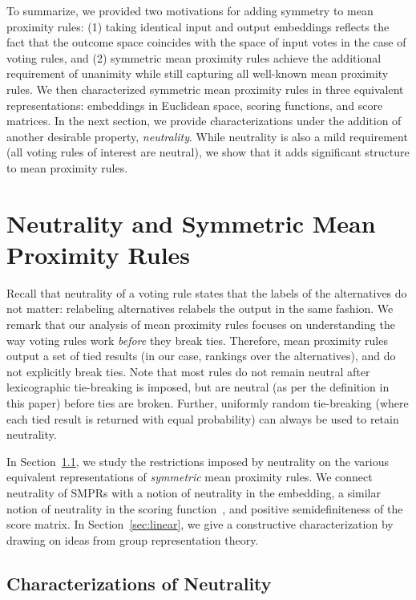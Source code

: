 \documentclass[prodmode]{acmsmall-ec14}
\begin{document}
To summarize, we provided two motivations for adding symmetry to mean proximity rules: (1) taking identical input and output embeddings reflects the fact that the outcome space coincides with the space of input votes in the case of voting rules, and (2) symmetric mean proximity rules achieve the additional requirement of unanimity while still capturing all well-known mean proximity rules. We then characterized symmetric mean proximity rules in three equivalent representations: embeddings in Euclidean space, scoring functions, and score matrices. In the next section, we provide characterizations under the addition of another desirable property, \emph{neutrality}. While neutrality is also a mild requirement (all voting rules of interest are neutral), we show that it adds significant structure to mean proximity rules. 


\section{Neutrality and Symmetric Mean Proximity Rules}
\label{sec:neutrality}
Recall that neutrality of a voting rule states that the labels of the alternatives do not matter: relabeling alternatives relabels the output in the same fashion. We remark that our analysis of mean proximity rules focuses on understanding the way voting rules work \emph{before} they break ties. Therefore, mean proximity rules output a set of tied results (in our case, rankings over the alternatives), and do not explicitly break ties. Note that most rules do not remain neutral after lexicographic tie-breaking is imposed, but are neutral (as per the definition in this paper) before ties are broken. Further, uniformly random tie-breaking (where each tied result is returned with equal probability) can always be used to retain neutrality. 

In Section~\ref{sec:charact}, we study the restrictions imposed by neutrality on the various equivalent representations of \emph{symmetric} mean proximity rules. We connect neutrality of SMPRs with a notion of neutrality in the embedding, a similar notion of neutrality in the scoring function~\cite{CRX09}, and positive semidefiniteness of the score matrix. In Section~\ref{sec:linear}, we give a constructive characterization by drawing on ideas from group representation theory. 

\subsection{Characterizations of Neutrality}
\label{sec:charact}
\end{document}
